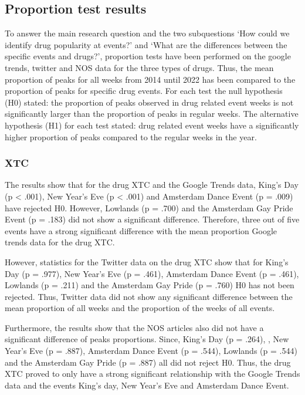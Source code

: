\subsection{Proportion test results}

To answer the main research question and the two subquestions ‘How could we identify drug popularity at events?’ and ‘What are the differences between the specific events and drugs?’, proportion tests have been performed on the google trends, twitter and NOS data for the three types of drugs. Thus, the mean proportion of peaks for all weeks from 2014 until 2022 has been compared to the proportion of peaks for specific drug events. For each test the null hypothesis (H0) stated: the proportion of peaks observed in drug related event weeks is not significantly larger than the proportion of peaks in regular weeks. The alternative hypothesis (H1) for each test stated: drug related event weeks have a significantly higher proportion of peaks compared to the regular weeks in the year.

\subsubsection{XTC}

The results show that for the drug XTC and the Google Trends data, King’s Day (p < .001), New Year’s Eve (p < .001) and Amsterdam Dance Event (p = .009) have rejected H0. However, Lowlands (p = .700) and the Amsterdam Gay Pride Event (p = .183) did not show a significant difference. Therefore, three out of five events have a strong significant difference with the mean proportion Google trends data for the drug XTC.

However, statistics for the Twitter data on the drug XTC show that for King’s Day (p = .977), New Year’s Eve (p = .461), Amsterdam Dance Event (p = .461), Lowlands (p = .211) and the Amsterdam Gay Pride (p = .760) H0 has not been rejected. Thus, Twitter data did not show any significant difference between the mean proportion of all weeks and the proportion of the weeks of all events.

Furthermore, the results show that the NOS articles also did not have a significant difference of peaks proportions. Since, King’s Day (p = .264), , New Year’s Eve (p = .887), Amsterdam Dance Event (p = .544), Lowlands (p = .544) and the Amsterdam Gay Pride (p = .887) all did not reject H0. Thus, the drug XTC proved to only have a strong significant relationship with the Google Trends data and the events King’s day, New Year’s Eve and Amsterdam Dance Event.

